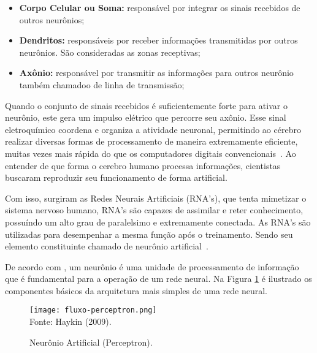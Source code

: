     \begin{itemize}
        \item \textbf{Corpo Celular ou Soma: }responsável por integrar os sinais recebidos de outros neurônios;
        \item \textbf{Dendritos: }responsáveis por receber informações transmitidas por outros neurônios. 
        São consideradas as zonas receptivas;
        \item \textbf{Axônio: }responsável por transmitir as informações para outros neurônio também chamadoo de linha de 
        transmissão;
    \end{itemize}

    Quando o conjunto de sinais recebidos é suficientemente forte para ativar o neurônio, este gera um impulso elétrico 
    que percorre seu axônio. Esse sinal eletroquímico coordena e organiza a atividade neuronal, permitindo ao cérebro realizar 
    diversas formas de processamento de maneira extremamente eficiente, muitas vezes mais rápida do que os computadores digitais 
    convencionais~\cite{haykin2009neural}. Ao entender de que forma o cerebro humano processa informações, cientistas buscaram 
    reproduzir seu funcionamento de forma artificial.
    
    Com isso, surgiram as Redes Neurais Artificiais (RNA's), que tenta mimetizar o sistema nervoso humano, RNA's são capazes de
    assimilar e reter conhecimento, possuíndo um alto grau de paralelsimo e extremamente conectada. As RNA's são utilizadas para
    desempenhar a mesma função após o treinamento. Sendo seu elemento constituinte chamado de neurônio artificial~\cite{ulinick2019}.

    De acordo com , um neurônio é uma unidade de processamento de informação que é fundamental para a operação de um
    rede neural. Na Figura \ref{fig:fluxo-perceptron} é ilustrado os componentes básicos da arquitetura mais simples de uma rede neural.
    \begin{figure}[!htb]
        \centering
        \caption{Neurônio Artificial (Perceptron).}
        \texttt{[image: fluxo-perceptron.png]}\\
        {\footnotesize Fonte: Haykin (2009).}\
        \label{fig:fluxo-perceptron}
    \end{figure}
    
